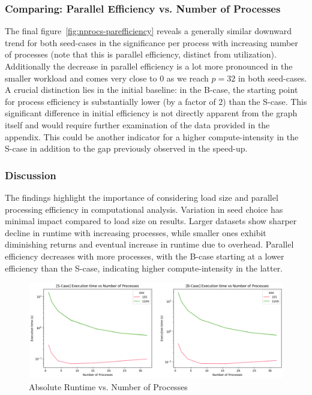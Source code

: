 \documentclass[a4paper,%
11pt,%
DIV12,
headsepline,%
headings=normal,
]{scrartcl}
\begin{document}
\subsubsection{Comparing: Parallel Efficiency vs. Number of Processes}

The final figure~\ref{fig:nprocs-parefficiency} reveals a generally similar downward trend for both seed-cases in the significance per process with increasing number of processes (note that this is parallel efficiency, distinct from utilization). Additionally the decrease in parallel efficiency is a lot more pronounced in the smaller workload and comes very close to 0 as we reach $p=32$ in both seed-cases.
A crucial distinction lies in the initial baseline: in the B-case, the starting point for process efficiency is substantially lower (by a factor of 2) than the S-case. This significant difference in initial efficiency is not directly apparent from the graph itself and would require further examination of the data provided in the appendix. This could be another indicator for a higher compute-intensity in the S-case in addition to the gap previously observed in the speed-up.

\subsubsection{Discussion}

The findings highlight the importance of considering load size and parallel processing efficiency in computational analysis. Variation in seed choice has minimal impact compared to load size on results. Larger datasets show sharper decline in runtime with increasing processes, while smaller ones exhibit diminishing returns and eventual increase in runtime due to overhead. Parallel efficiency decreases with more processes, with the B-case starting at a lower efficiency than the S-case, indicating higher compute-intensity in the latter.

\begin{figure}[htb!]
    \centering
    \includegraphics[width=\textwidth]{nprocs-exectime.png}
    \caption{Absolute Runtime vs. Number of Processes}
    \label{fig:nprocs-exectime}
\end{figure}
\end{document}
